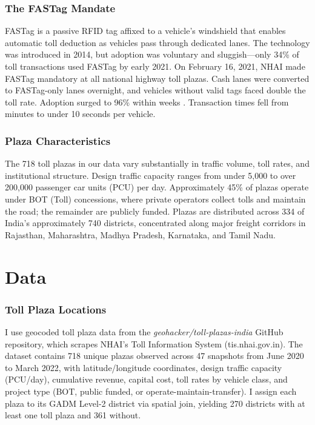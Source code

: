 \documentclass[12pt]{article}
\begin{document}
\subsubsection*{The FASTag Mandate} FASTag is a passive RFID tag affixed to a vehicle's windshield that enables automatic toll deduction as vehicles pass through dedicated lanes. The technology was introduced in 2014, but adoption was voluntary and sluggish---only 34\% of toll transactions used FASTag by early 2021. On February 16, 2021, NHAI made FASTag mandatory at all national highway toll plazas. Cash lanes were converted to FASTag-only lanes overnight, and vehicles without valid tags faced double the toll rate. Adoption surged to 96\% within weeks \citep{nhai2021annual}. Transaction times fell from minutes to under 10 seconds per vehicle.

\subsubsection*{Plaza Characteristics} The 718 toll plazas in our data vary substantially in traffic volume, toll rates, and institutional structure. Design traffic capacity ranges from under 5,000 to over 200,000 passenger car units (PCU) per day. Approximately 45\% of plazas operate under BOT (Toll) concessions, where private operators collect tolls and maintain the road; the remainder are publicly funded. Plazas are distributed across 334 of India's approximately 740 districts, concentrated along major freight corridors in Rajasthan, Maharashtra, Madhya Pradesh, Karnataka, and Tamil Nadu.

\section{Data}

\subsubsection*{Toll Plaza Locations} I use geocoded toll plaza data from the \textit{geohacker/toll-plazas-india} GitHub repository, which scrapes NHAI's Toll Information System (tis.nhai.gov.in). The dataset contains 718 unique plazas observed across 47 snapshots from June 2020 to March 2022, with latitude/longitude coordinates, design traffic capacity (PCU/day), cumulative revenue, capital cost, toll rates by vehicle class, and project type (BOT, public funded, or operate-maintain-transfer). I assign each plaza to its GADM Level-2 district via spatial join, yielding 270 districts with at least one toll plaza and 361 without.
\end{document}
